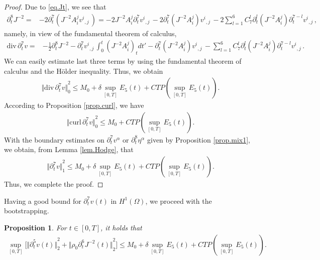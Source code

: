 \documentclass[12pt,twoside,reqno]{amsart}
\numberwithin{equation}{section}
\newtheorem{proposition}[theorem]{Proposition}
\theoremstyle{definition}
\theoremstyle{remark}
\begin{document}
\begin{proof}
Due to \eqref{eq.Jt}, we see that
\begin{align*}
  {\partial}_t^8 J^{-2}=&-2 {\partial}_t^7(J^{-2}A_i^j{{{v^i}}_{,{j}}\,})
  =-2 J^{-2}A_i^j{\partial}_t^7{{{v^i}}_{,{j}}\,}-2 {\partial}_t^7 (J^{-2}A_i^j){{{v^i}}_{,{j}}\,}-2 \sum_{l=1}^6 C_7^l {\partial}_t^l( J^{-2}A_i^j){\partial}_t^{7-l}{{{v^i}}_{,{j}}\,},
\end{align*}
namely, in view of the fundamental theorem of calculus,
\begin{align*}
  {\mathrm{div}\,}{\partial}_t^7 v=&-\frac{1}{2}{\partial}_t^8 J^{-2}-{\partial}_t^7{{{v^i}}_{,{j}}\,}\int_0^t(J^{-2}A_i^j)_tdt'- {\partial}_t^7 (J^{-2}A_i^j){{{v^i}}_{,{j}}\,}
  - \sum_{l=1}^6 C_7^l {\partial}_t^l( J^{-2}A_i^j){\partial}_t^{7-l}{{{v^i}}_{,{j}}\,}.
\end{align*}
We can easily estimate last three terms by using the fundamental theorem of calculus and the H\"older inequality. Thus, we obtain
\begin{align*}
  {\Vert{{\mathrm{div}\,}{\partial}_t^7 v}\Vert}_0^2{\leqslant} M_0+\delta \sup_{[0,T]} E_5(t)+CTP(\sup_{[0,T]}E_5(t)).
\end{align*}
According to Proposition \ref{prop.curl}, we have
\begin{align*}
  {\Vert{{\mathrm{curl}\,}{\partial}_t^7 v}\Vert}_0^2{\leqslant} M_0+CTP(\sup_{[0,T]}E_5(t)).
\end{align*}
With the boundary estimates on ${\partial}_t^7 v^\alpha$ or  ${\partial}_t^8 \eta^\alpha$ given by Proposition \ref{prop.mix1}, we obtain, from Lemma \ref{lem.Hodge}, that
\begin{align*}
  {\Vert{{\partial}_t^7 v}\Vert}_1^2{\leqslant} M_0+\delta \sup_{[0,T]} E_5(t)+CTP(\sup_{[0,T]}E_5(t)).
\end{align*}
Thus, we complete the proof.
\end{proof}

Having a good bound for ${\partial}_t^7 v(t)$ in $H^1(\Omega)$, we proceed with the bootstrapping.

\begin{proposition}\label{prop.vt5}
  For $t\in [0,T]$, it holds that
  \begin{align*}
    \sup_{[0,T]}\Big[{\Vert{ {\partial}_t^5 v(t)}\Vert}_2^2+{\Vert{{\rho_0}  {\partial}_t^6J^{-2}(t)}\Vert}_2^2\Big]{\leqslant}  M_0+\delta \sup_{[0,T]} E_5(t)+CTP(\sup_{[0,T]}E_5(t)).
  \end{align*}
\end{proposition}
\end{document}
